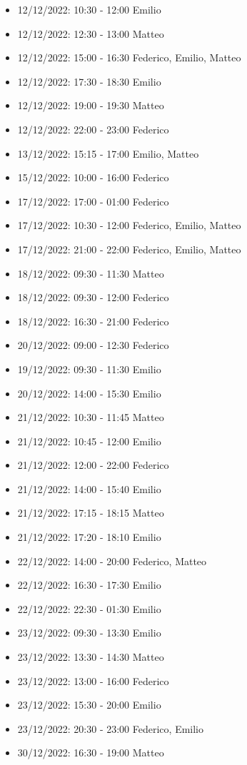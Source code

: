 \begin{itemize}
    \item 12/12/2022: 10:30 - 12:00 Emilio
    \item 12/12/2022: 12:30 - 13:00 Matteo
    \item 12/12/2022: 15:00 - 16:30 Federico, Emilio, Matteo
    \item 12/12/2022: 17:30 - 18:30 Emilio
    \item 12/12/2022: 19:00 - 19:30 Matteo
    \item 12/12/2022: 22:00 - 23:00 Federico
    \item 13/12/2022: 15:15 - 17:00 Emilio, Matteo
    \item 15/12/2022: 10:00 - 16:00 Federico
    \item 17/12/2022: 17:00 - 01:00 Federico
    \item 17/12/2022: 10:30 - 12:00 Federico, Emilio, Matteo
    \item 17/12/2022: 21:00 - 22:00 Federico, Emilio, Matteo
    \item 18/12/2022: 09:30 - 11:30 Matteo
    \item 18/12/2022: 09:30 - 12:00 Federico
    \item 18/12/2022: 16:30 - 21:00 Federico
    \item 20/12/2022: 09:00 - 12:30 Federico
    \item 19/12/2022: 09:30 - 11:30 Emilio
    \item 20/12/2022: 14:00 - 15:30 Emilio
    \item 21/12/2022: 10:30 - 11:45 Matteo
    \item 21/12/2022: 10:45 - 12:00 Emilio
    \item 21/12/2022: 12:00 - 22:00 Federico
    \item 21/12/2022: 14:00 - 15:40 Emilio
    \item 21/12/2022: 17:15 - 18:15 Matteo
    \item 21/12/2022: 17:20 - 18:10 Emilio
    \item 22/12/2022: 14:00 - 20:00 Federico, Matteo
    \item 22/12/2022: 16:30 - 17:30 Emilio
    \item 22/12/2022: 22:30 - 01:30 Emilio
    \item 23/12/2022: 09:30 - 13:30 Emilio
    \item 23/12/2022: 13:30 - 14:30 Matteo
    \item 23/12/2022: 13:00 - 16:00 Federico
    \item 23/12/2022: 15:30 - 20:00 Emilio
    \item 23/12/2022: 20:30 - 23:00 Federico, Emilio
    \item 30/12/2022: 16:30 - 19:00 Matteo
\end{itemize}